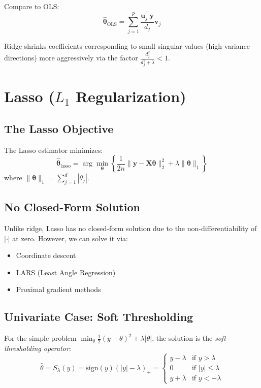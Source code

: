 \documentclass[main.tex]{subfiles}
\begin{document}
Compare to OLS:
$$\hat{\boldsymbol{\theta}}_{\text{OLS}} = \sum_{j=1}^{p} \frac{\mathbf{u}_j^\top\mathbf{y}}{d_j}\mathbf{v}_j$$

Ridge shrinks coefficients corresponding to small singular values (high-variance directions) more aggressively via the factor $\frac{d_j^2}{d_j^2 + \lambda} < 1$.

\needspace{0.33\textheight}
\section{Lasso ($L_1$ Regularization)}

\subsection{The Lasso Objective}

\begin{definition}[Lasso]
The Lasso estimator minimizes:
$$\hat{\boldsymbol{\theta}}_{\text{lasso}} = \arg\min_{\boldsymbol{\theta}} \left\{ \frac{1}{2n}\|\mathbf{y} - \mathbf{X}\boldsymbol{\theta}\|_2^2 + \lambda\|\boldsymbol{\theta}\|_1 \right\}$$
where $\|\boldsymbol{\theta}\|_1 = \sum_{j=1}^{d}|\theta_j|$.
\end{definition}

\subsection{No Closed-Form Solution}

Unlike ridge, Lasso has no closed-form solution due to the non-differentiability of $|\cdot|$ at zero. However, we can solve it via:
\begin{itemize}
    \item Coordinate descent
    \item LARS (Least Angle Regression)
    \item Proximal gradient methods
\end{itemize}

\subsection{Univariate Case: Soft Thresholding}

For the simple problem $\min_\theta \frac{1}{2}(y - \theta)^2 + \lambda|\theta|$, the solution is the \textit{soft-thresholding operator}:
$$\hat{\theta} = S_\lambda(y) = \text{sign}(y)(|y| - \lambda)_+ = \begin{cases}
y - \lambda & \text{if } y > \lambda \\
0 & \text{if } |y| \leq \lambda \\
y + \lambda & \text{if } y < -\lambda
\end{cases}$$
\end{document}
